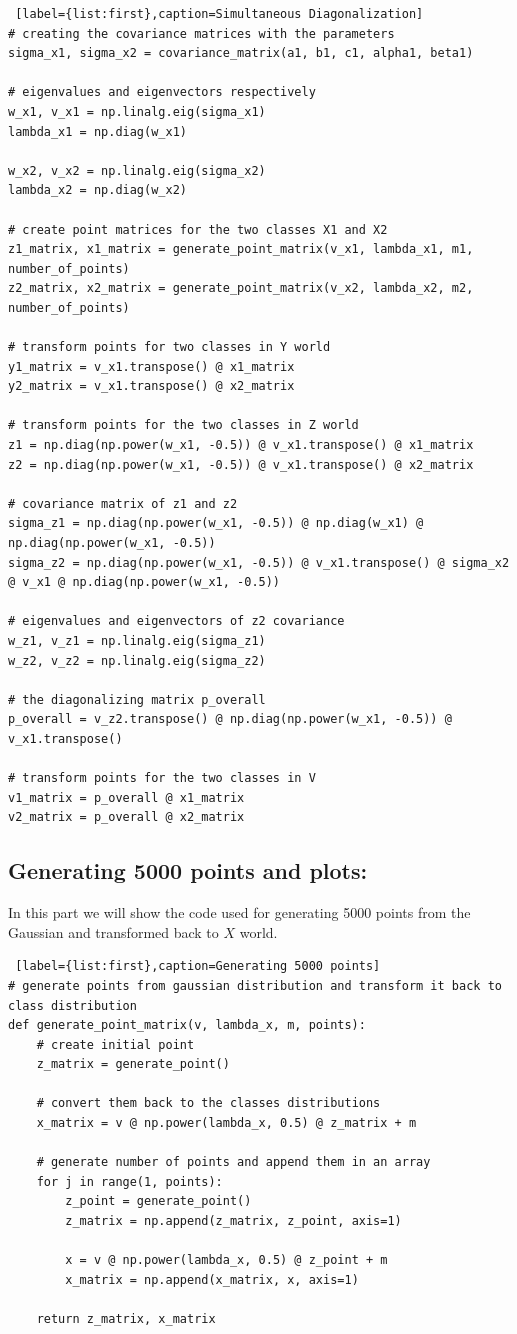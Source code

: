 \documentclass[11pt, oneside]{article}   	%
\begin{document}
\begin{lstlisting} [label={list:first},caption=Simultaneous Diagonalization]
# creating the covariance matrices with the parameters
sigma_x1, sigma_x2 = covariance_matrix(a1, b1, c1, alpha1, beta1)

# eigenvalues and eigenvectors respectively
w_x1, v_x1 = np.linalg.eig(sigma_x1)
lambda_x1 = np.diag(w_x1)

w_x2, v_x2 = np.linalg.eig(sigma_x2)
lambda_x2 = np.diag(w_x2)

# create point matrices for the two classes X1 and X2
z1_matrix, x1_matrix = generate_point_matrix(v_x1, lambda_x1, m1, number_of_points)
z2_matrix, x2_matrix = generate_point_matrix(v_x2, lambda_x2, m2, number_of_points)

# transform points for two classes in Y world
y1_matrix = v_x1.transpose() @ x1_matrix
y2_matrix = v_x1.transpose() @ x2_matrix

# transform points for the two classes in Z world
z1 = np.diag(np.power(w_x1, -0.5)) @ v_x1.transpose() @ x1_matrix
z2 = np.diag(np.power(w_x1, -0.5)) @ v_x1.transpose() @ x2_matrix

# covariance matrix of z1 and z2
sigma_z1 = np.diag(np.power(w_x1, -0.5)) @ np.diag(w_x1) @ np.diag(np.power(w_x1, -0.5))
sigma_z2 = np.diag(np.power(w_x1, -0.5)) @ v_x1.transpose() @ sigma_x2 @ v_x1 @ np.diag(np.power(w_x1, -0.5))

# eigenvalues and eigenvectors of z2 covariance
w_z1, v_z1 = np.linalg.eig(sigma_z1)
w_z2, v_z2 = np.linalg.eig(sigma_z2)

# the diagonalizing matrix p_overall
p_overall = v_z2.transpose() @ np.diag(np.power(w_x1, -0.5)) @ v_x1.transpose()

# transform points for the two classes in V
v1_matrix = p_overall @ x1_matrix
v2_matrix = p_overall @ x2_matrix
\end{lstlisting}

\subsection{Generating 5000 points and plots:}
In this part we will show the code used for generating 5000 points from the Gaussian and transformed back to $X$ world.
\begin{lstlisting} [label={list:first},caption=Generating 5000 points]
# generate points from gaussian distribution and transform it back to class distribution
def generate_point_matrix(v, lambda_x, m, points):
    # create initial point
    z_matrix = generate_point()

    # convert them back to the classes distributions
    x_matrix = v @ np.power(lambda_x, 0.5) @ z_matrix + m

    # generate number of points and append them in an array
    for j in range(1, points):
        z_point = generate_point()
        z_matrix = np.append(z_matrix, z_point, axis=1)

        x = v @ np.power(lambda_x, 0.5) @ z_point + m
        x_matrix = np.append(x_matrix, x, axis=1)

    return z_matrix, x_matrix

\end{lstlisting}
\end{document}
